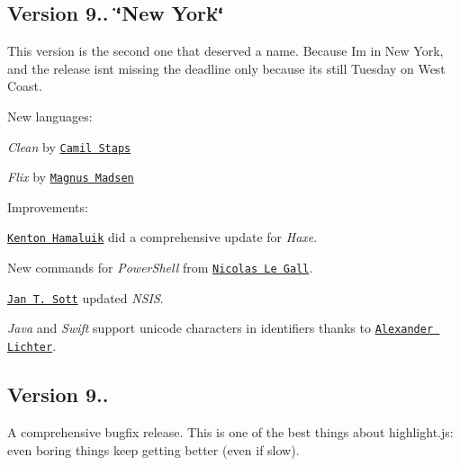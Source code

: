 \subsection*{Version 9.. \char`\"{}\+New York\char`\"{}}

This version is the second one that deserved a name. Because I\textquotesingle{}m in New York, and the release isn\textquotesingle{}t missing the deadline only because it\textquotesingle{}s still Tuesday on West Coast.

New languages\+:


\begin{DoxyItemize}
\item {\itshape Clean} by \href{https://github.com/camilstaps}{\tt Camil Staps}
\item {\itshape Flix} by \href{https://github.com/magnus-madsen}{\tt Magnus Madsen}
\end{DoxyItemize}

Improvements\+:


\begin{DoxyItemize}
\item \href{https://github.com/FuzzyWuzzie}{\tt Kenton Hamaluik} did a comprehensive update for {\itshape Haxe}.
\item New commands for {\itshape Power\+Shell} from \href{https://github.com/darkitty}{\tt Nicolas Le Gall}.
\item \href{https://github.com/idleberg}{\tt Jan T. Sott} updated {\itshape N\+S\+IS}.
\item {\itshape Java} and {\itshape Swift} support unicode characters in identifiers thanks to \href{https://github.com/manniL}{\tt Alexander Lichter}.
\end{DoxyItemize}

\subsection*{Version 9..}

A comprehensive bugfix release. This is one of the best things about highlight.\+js\+: even boring things keep getting better (even if slow).


